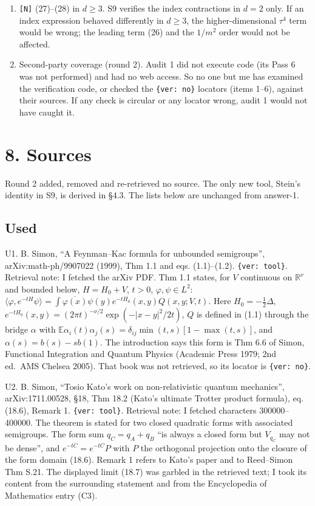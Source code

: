 \documentclass[11pt,a4paper]{article}
\begin{document}
\begin{enumerate}
\item
  \texttt{[N]} (27)--(28) in \(d\ge3\). S9 verifies the index contractions in \(d=2\) only. If an index expression behaved differently in \(d\ge3\), the higher-dimensional \(\tau^4\) term would be wrong; the leading term (26) and the \(1/m^2\) order would not be affected.
\item
  Second-party coverage (round 2). Audit 1 did not execute code (its Pass 6 was not performed) and had no web access. So no one but me has examined the verification code, or checked the \texttt{\{ver: no\}} locators (items 1--6), against their sources. If any check is circular or any locator wrong, audit 1 would not have caught it.
\end{enumerate}

\hypertarget{sources}{%
\section{8. Sources}\label{sources}}

Round 2 added, removed and re-retrieved no source. The only new tool, Stein's identity in S9, is derived in §4.3. The lists below are unchanged from answer-1.

\hypertarget{used}{%
\subsection{Used}\label{used}}

U1. B. Simon, ``A Feynman--Kac formula for unbounded semigroups'', arXiv:math-ph/9907022 (1999), Thm 1.1 and eqs. (1.1)--(1.2). \texttt{\{ver: tool\}}. Retrieval note: I fetched the arXiv PDF. Thm 1.1 states, for \(V\) continuous on \(\mathbb R^\nu\) and bounded below, \(H=H_0+V\), \(t>0\), \(\varphi,\psi\in L^2\): \(\langle\varphi,e^{-tH}\psi\rangle=\int\overline{\varphi(x)}\psi(y)e^{-tH_0}(x,y)Q(x,y;V,t)\). Here \(H_0=-\tfrac12\Delta\), \(e^{-tH_0}(x,y)=(2\pi t)^{-\nu/2}\exp(-|x-y|^2/2t)\), \(Q\) is defined in (1.1) through the bridge \(\alpha\) with \(\mathbb E\alpha_i(t)\alpha_j(s)=\delta_{ij}\min(t,s)[1-\max(t,s)]\), and \(\alpha(s)=b(s)-sb(1)\). The introduction says this form is Thm 6.6 of Simon, Functional Integration and Quantum Physics (Academic Press 1979; 2nd ed.~AMS Chelsea 2005). That book was not retrieved, so its locator is \texttt{\{ver: no\}}.

U2. B. Simon, ``Tosio Kato's work on non-relativistic quantum mechanics'', arXiv:1711.00528, §18, Thm 18.2 (Kato's ultimate Trotter product formula), eq. (18.6), Remark 1. \texttt{\{ver: tool\}}. Retrieval note: I fetched characters 300000--400000. The theorem is stated for two closed quadratic forms with associated semigroups. The form sum \(q_C=q_A+q_B\) ``is always a closed form but \(V_{q_C}\) may not be dense'', and \(e^{-t\dot C}=e^{-tC}P\) with \(P\) the orthogonal projection onto the closure of the form domain (18.6). Remark 1 refers to Kato's paper and to Reed--Simon Thm S.21. The displayed limit (18.7) was garbled in the retrieved text; I took its content from the surrounding statement and from the Encyclopedia of Mathematics entry (C3).
\end{document}
